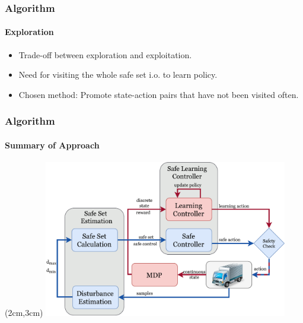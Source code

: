 \documentclass[t]{beamer}
\begin{document}
\begin{frame}
\frametitle{Algorithm}
\framesubtitle{Exploration}
\begin{itemize}
\item Trade-off between exploration and exploitation.
\item Need for visiting the whole safe set i.o. to learn policy.
\item Chosen method: Promote state-action pairs that have not been visited often.
\end{itemize}
\end{frame}

\begin{frame}
\frametitle{Algorithm}
\framesubtitle{Summary of Approach}
\begin{textblock*}{11cm}(2cm,3cm) %
\includegraphics[trim=3mm 3mm 3mm 14mm, width=0.8\textwidth]{flow_final}
\end{textblock*}
\end{frame}
\end{document}
